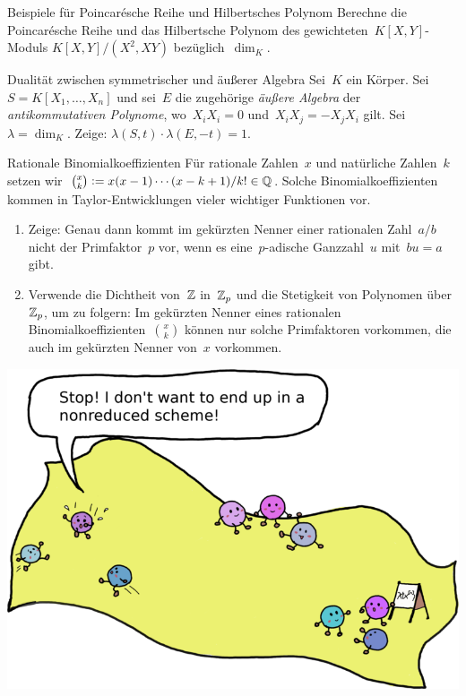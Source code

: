 \documentclass[entwurf]{uebblatt}
\begin{document}

\begin{aufgabe}{3}{Beispiele für Poincarésche Reihe und Hilbertsches Polynom}
Berechne die Poincarésche Reihe und das Hilbertsche Polynom des
gewichteten~$K[X,Y]$-Moduls $K[X,Y]/(X^2, XY)$ bezüglich~$\dim_K$.
\end{aufgabe}

\begin{aufgabe}{1}{Dualität zwischen symmetrischer und äußerer Algebra}
Sei~$K$ ein Körper. Sei~$S = K[X_1,\ldots,X_n]$ und sei~$E$ die zugehörige \emph{äußere Algebra}
der \emph{antikommutativen Polynome}, wo~$X_i X_i = 0$ und~$X_i X_j =
-X_j X_i$ gilt. Sei~$\lambda = \dim_K$.
Zeige: $\lambda(S, t) \cdot \lambda(E, -t) = 1$.
\end{aufgabe}

\vfill

\begin{aufgabe}{0}{Rationale Binomialkoeffizienten}
\small
Für rationale Zahlen~$x$ und natürliche Zahlen~$k$ setzen wir~$\binom{x}{k}
\vcentcolon= x (x-1) \cdots (x-k+1) / k! \in \mathbb{Q}$. Solche Binomialkoeffizienten
kommen in Taylor-Entwicklungen vieler wichtiger Funktionen vor.
\begin{enumerate}
\item Zeige: Genau dann kommt im gekürzten Nenner einer rationalen Zahl~$a/b$
nicht der Primfaktor~$p$ vor, wenn es eine~$p$-adische Ganzzahl~$u$ mit~$bu = a$ gibt.
\item Verwende die Dichtheit von~$\mathbb{Z}$ in~$\mathbb{Z}_p$ und die Stetigkeit von
Polynomen über~$\mathbb{Z}_p$, um zu folgern: Im gekürzten Nenner eines rationalen
Binomialkoeffizienten~$\binom{x}{k}$ können nur solche Primfaktoren vorkommen, die auch
im gekürzten Nenner von~$x$ vorkommen.
\end{enumerate}
\end{aufgabe}

\centering
\includegraphics{images/hilbert-scheme-of-points}
\end{document}
